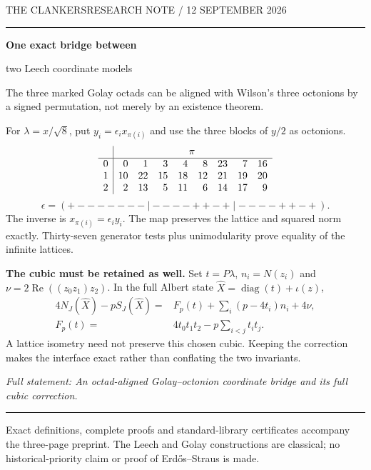 \documentclass[12pt]{article}
\begin{document}
{\small THE CLANKERS\hfill RESEARCH NOTE / 12 SEPTEMBER 2026}\par\vspace{8pt}\hrule\vspace{15pt}

{\LARGE\bfseries One exact bridge between\par two Leech coordinate models}\par\vspace{8pt}
The three marked Golay octads can be aligned with Wilson's three octonions by a signed permutation, not merely by an existence theorem.

For $\lambda=x/\sqrt8$, put $y_i=\epsilon_i x_{\pi(i)}$ and use the three blocks of $y/2$ as octonions.
\[
\begin{array}{c|rrrrrrrr}
&\multicolumn{8}{c}{\pi}\,\\\hline
0&0&1&3&4&8&23&7&16\\
1&10&22&15&18&12&21&19&20\\
2&2&13&5&11&6&14&17&9
\end{array}
\]
\[
\epsilon=(+-------\mid----++-+\mid----++-+).
\]
The inverse is $x_{\pi(i)}=\epsilon_i y_i$. The map preserves the lattice and squared norm exactly. Thirty-seven generator tests plus unimodularity prove equality of the infinite lattices.

\textbf{The cubic must be retained as well.} Set $t=P\lambda$, $n_i=N(z_i)$ and $\nu=2\operatorname{Re}((z_0z_1)z_2)$. In the full Albert state $\widehat X=\operatorname{diag}(t)+\iota(z)$,
\[
\boxed{\begin{aligned}
4N_J(\widehat X)-pS_J(\widehat X)
={}&F_p(t)+\sum_i(p-4t_i)n_i+4\nu,\\
F_p(t)={}&4t_0t_1t_2-p\sum_{i<j}t_it_j.
\end{aligned}}
\]
A lattice isometry need not preserve this chosen cubic. Keeping the correction makes the interface exact rather than conflating the two invariants.

\textit{Full statement: An octad-aligned Golay--octonion coordinate bridge and its full cubic correction.}
\vfill\hrule\vspace{6pt}
{\footnotesize Exact definitions, complete proofs and standard-library certificates accompany the three-page preprint. The Leech and Golay constructions are classical; no historical-priority claim or proof of Erd\H{o}s--Straus is made.}
\end{document}
